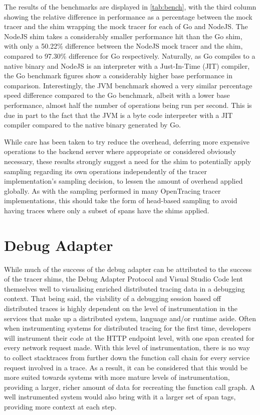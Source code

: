 \documentclass[12pt,pdftex,titlepage]{report}
\begin{document}
                The results of the benchmarks are displayed in \autoref{tab:bench}, with the third column showing the relative difference in performance as a percentage between the mock tracer
                and the shim wrapping the mock tracer for each of Go and NodeJS. The NodeJS shim takes a considerably smaller performance hit than the Go shim, with only a 50.22\% difference
                between the NodeJS mock tracer and the shim, compared to 97.30\% difference for Go respectively. Naturally, as Go compiles to a native binary and NodeJS is an interpreter with a
                Just-In-Time (JIT) compiler, the Go benchmark figures show a considerably higher base performance in comparison. Interestingly, the JVM benchmark showed a very similar percentage speed
                difference compared to the Go benchmark, albeit with a lower base performance, almost half the number of operations being run per second. This is due in part to the fact that the JVM is a byte code 
                interpreter with a JIT compiler compared to the native binary generated by Go.

                While care has been taken to try reduce the overhead, deferring more expensive operations to the backend server where appropriate or considered obviously necessary, these results 
                strongly suggest a need for the shim to potentially apply sampling regarding its own operations independently of the tracer implementation's sampling decision, to lessen the amount of overhead 
                applied globally. As with the sampling performed in many OpenTracing tracer implementations, this should take the form of head-based sampling to avoid having traces where only a subset of spans 
                have the shims applied.

        \section{Debug Adapter}
            While much of the success of the debug adapter can be attributed to the success of the tracer shims, the Debug Adapter Protocol and Visual Studio Code lent themselves well to visualising
                enriched distributed tracing data in a debugging context. That being said, the viability of a debugging session based off distributed traces is highly dependent on the level of instrumentation
            in the services that make up a distributed system, language and/or runtime aside. Often when instrumenting systems for distributed tracing for the first time, developers will instrument their code 
            at the HTTP endpoint level, with one span created for every network request made. With this level of instrumentation, there is no way to collect stacktraces from further down the function call 
            chain for every service request involved in a trace. As a result, it can be considered that this would be more suited towards systems with more mature levels of instrumentation, providing a larger, 
            richer amount of data for recreating the function call graph. A well instrumented system would also bring with it a larger set of span tags, providing more context at each step.
                
\end{document}
